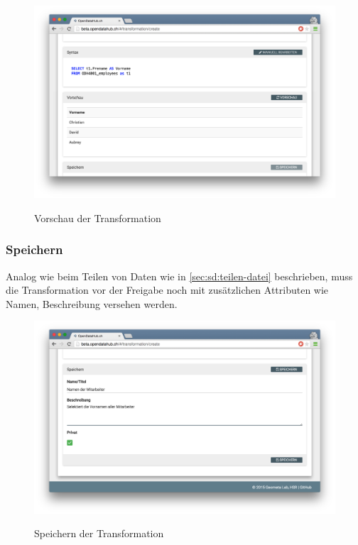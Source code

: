 \begin{figure}[H]
	\centering
	\includegraphics[width=\linewidth]{fig/screenshot-vorschau}
	\label{fig:sd:screenshot-vorschau}
	\caption{Vorschau der Transformation}
\end{figure}


\subsubsection{Speichern}
 
 Analog wie beim Teilen von Daten wie in \vref{sec:sd:teilen-datei} beschrieben, muss die Transformation vor der Freigabe noch mit zusätzlichen Attributen wie Namen, Beschreibung versehen werden.

\begin{figure}[H]
	\centering
	\includegraphics[width=\linewidth]{fig/screenshot-transformation-speichern}
	\label{fig:sd:screenshot-transformation-speichern}
	\caption{Speichern der Transformation}
\end{figure}



